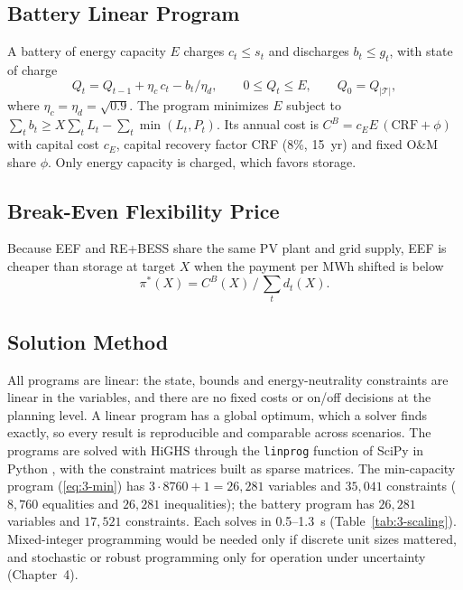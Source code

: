 \subsection{Battery Linear Program}

A battery of energy capacity $E$ charges $c_t\le s_t$ and discharges $b_t\le g_t$, with state of charge
\begin{equation}
Q_t=Q_{t-1}+\eta_c\,c_t-b_t/\eta_d,\qquad 0\le Q_t\le E,\qquad Q_0=Q_{|\mathcal{T}|},
\end{equation}
where $\eta_c=\eta_d=\sqrt{0.9}$. The program minimizes $E$ subject to $\sum_t b_t\ge X\sum_tL_t-\sum_t\min(L_t,P_t)$. Its annual cost is $C^B=c_E E\,(\mathrm{CRF}+\phi)$ with capital cost $c_E$, capital recovery factor CRF (8\%, 15~yr) and fixed O\&M share $\phi$. Only energy capacity is charged, which favors storage.

\subsection{Break-Even Flexibility Price}

Because EEF and RE+BESS share the same PV plant and grid supply, EEF is cheaper than storage at target $X$ when the payment per MWh shifted is below
\begin{equation}
\pi^\ast(X)=C^B(X)\,\big/\,\textstyle\sum_t d_t(X).
\label{eq:3-breakeven}
\end{equation}

\subsection{Solution Method}

All programs are linear: the state, bounds and energy-neutrality constraints are linear in the variables, and there are no fixed costs or on/off decisions at the planning level. A linear program has a global optimum, which a solver finds exactly, so every result is reproducible and comparable across scenarios. The programs are solved with HiGHS \cite{highs} through the \texttt{linprog} function of SciPy in Python \cite{scipy}, with the constraint matrices built as sparse matrices. The min-capacity program (\ref{eq:3-min}) has $3\cdot8760+1=26{,}281$ variables and $35{,}041$ constraints ($8{,}760$ equalities and $26{,}281$ inequalities); the battery program has $26{,}281$ variables and $17{,}521$ constraints. Each solves in 0.5--1.3~s (Table~\ref{tab:3-scaling}). Mixed-integer programming would be needed only if discrete unit sizes mattered, and stochastic or robust programming only for operation under uncertainty (Chapter~4).

